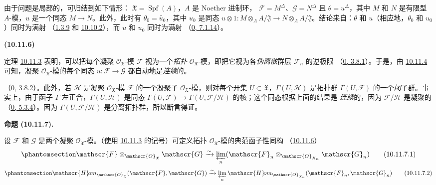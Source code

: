 \documentclass[UTF8,fontset=none,11pt,oneside,openany]{ctexbook}
\newenvironment{env}[1][]{%
  \par\medskip\noindent\textbf{(#1)}\ %
}{\par}
\newenvironment{proposition}[1][]{%
  \par\medskip\noindent\textbf{命题 (#1).}\ %
}{\par}
\newcommand{\oldpage}[2][]{%
  \hypertarget{ega-source-page-#1-#2}{}%
  \marginnote{\scriptsize\textbf{#1}~|~#2}\ignorespaces}
\let\EGAOriginalLabel\label
\renewcommand{\label}[1]{\phantomsection\EGAOriginalLabel{#1}}
\begin{document}
由于问题是局部的，可归结到如下情形：
$\mathfrak{X}=\operatorname{Spf}(A)$，$A$ 是 Noether 进制环，
$\mathscr{F}=M^\Delta$、$\mathscr{G}=N^\Delta$ 且 $\theta=u^\Delta$，其中 $M$ 和 $N$ 是有限型
$A$-模，$u$ 是一个同态 $M\to N$。此外，此时有
$\theta_0=\widetilde{u_0}$，其中 $u_0$ 是同态
$u\otimes1:M\otimes_A A/\mathfrak{J}\to
N\otimes_A A/\mathfrak{J}$。结论来自：$\theta$ 和 $u$（相应地，$\theta_0$ 和
$u_0$）同时为满射
（\hyperref[I.1.3.9-fr]{1.3.9} 和
\hyperref[I.10.10.2-fr]{10.10.2}），而 $u$ 和 $u_0$ 同时为满射
（\hyperref[0.7.1.14-fr]{0, 7.1.14}）。

\begin{env}[10.11.6]
\label{I.10.11.6-fr}
定理 \hyperref[I.10.11.3-fr]{10.11.3} 表明，可以把每个凝聚
$\mathscr{O}_{\mathfrak{X}}$-模 $\mathscr{F}$ 视为一个\emph{拓扑}
$\mathscr{O}_{\mathfrak{X}}$-模，即把它视为各\emph{伪离散}群层 $\mathscr{F}_n$ 的逆极限
（\hyperref[0.3.8.1-fr]{0, 3.8.1}）。于是，由
\hyperref[I.10.11.4-fr]{10.11.4} 可知，凝聚
$\mathscr{O}_{\mathfrak{X}}$-模的每个同态
$u:\mathscr{F}\to\mathscr{G}$ 都自动地是\emph{连续}的。

\oldpage[I]{205}

（\hyperref[0.3.8.2-fr]{0, 3.8.2}）。此外，若 $\mathscr{H}$ 是凝聚
$\mathscr{O}_{\mathfrak{X}}$-模 $\mathscr{F}$ 的一个凝聚子 $\mathscr{O}_{\mathfrak{X}}$-模，则对每个开集
$U\subset\mathfrak{X}$，$\Gamma(U,\mathscr{H})$ 是拓扑群
$\Gamma(U,\mathscr{F})$ 的一个\emph{闭}子群。事实上，由于函子
$\Gamma$ 左正合，$\Gamma(U,\mathscr{H})$ 是同态
$\Gamma(U,\mathscr{F})\to\Gamma(U,\mathscr{F}/\mathscr{H})$ 的核；这个同态根据上面的结果是
\emph{连续}的，因为 $\mathscr{F}/\mathscr{H}$ 是凝聚的
（\hyperref[0.5.3.4-fr]{0, 5.3.4}）。因为 $\Gamma(U,\mathscr{F}/\mathscr{H})$ 是分离拓扑群，所以断言得证。
\end{env}

\begin{proposition}[10.11.7]
\label{I.10.11.7-fr}
设 $\mathscr{F}$ 和 $\mathscr{G}$ 是两个凝聚 $\mathscr{O}_{\mathfrak{X}}$-模。（使用
\hyperref[I.10.11.3-fr]{10.11.3} 的记号）可定义拓扑
$\mathscr{O}_{\mathfrak{X}}$-模的典范函子性同构
（\hyperref[I.10.11.6-fr]{10.11.6}）
\[
  \label{I.10.11.7.1-fr}
  \mathscr{F}\otimes_{\mathscr{O}_{\mathfrak{X}}}\mathscr{G}
  \xrightarrow{\sim}
  \varprojlim_n
  (\mathscr{F}_n\otimes_{\mathscr{O}_{X_n}}\mathscr{G}_n)
  \tag{10.11.7.1}
\]
\[
  \label{I.10.11.7.2-fr}
  \mathscr{H}\!om_{\mathscr{O}_{\mathfrak{X}}}
  (\mathscr{F},\mathscr{G})
  \xrightarrow{\sim}
  \varprojlim_n
  \mathscr{H}\!om_{\mathscr{O}_{X_n}}(\mathscr{F}_n,\mathscr{G}_n)
  \tag{10.11.7.2}
\]
\end{proposition}
\end{document}

